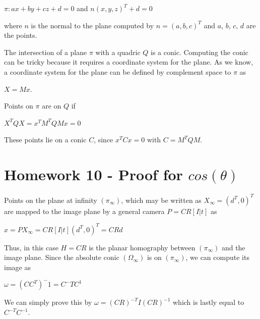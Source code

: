 \documentclass[]{article}
\begin{document}
\centerline {
	$\pi : ax + by + cz + d = 0$ and $n(x,y,z)^T + d = 0$
}

\vspace{0.5em}

where  $n$ is the normal to the plane computed by $n=(a,b,c)^T$ and $a$, $b$, $c$, $d$ are the points. 

The intersection of a plane $\pi$ with a quadric $Q$ is a conic. Computing the conic can be tricky because it requires a coordinate system for the plane. As we know, a coordinate system for the plane can be defined by complement space to $\pi$ as 

\centerline {
	$X= Mx$. 
}

Points on $\pi$ are on $Q$ if 

\vspace{0.5em}

\centerline {
	$X^TQX = x^TM^TQMx = 0$
}

\vspace{0.5em}

These points lie on a conic $C$, since $x^TCx = 0$ with $C = M^TQM$.
\section{Homework 10 - Proof for $cos(\theta)$}  

Points on the plane at infinity $(\pi _ \infty)$, which may be written as $X_ \infty = (d^T, 0)^T$ are mapped to the image plane by a general camera $P = CR[I|t]$ as 

\vspace{0.5em}

\centerline {
	$x = PX_ \infty = CR[I|t](d^T, 0)^T = CRd$
}

\vspace{0.5em}

Thus, in this case $H = CR$ is the planar homography between $(\pi _ \infty)$ and the image plane. Since the absolute conic $(\Omega _ \infty)$ is on $(\pi _ \infty)$, we can compute its image as 

\vspace{0.5em}

\centerline {
	$\omega = (CC^T)^-1 = C^-TC^1$
}

\vspace{0.5em}

We can simply prove this by $\omega = (CR)^{-T} I (CR)^{-1}$ which is lastly equal to $C^{-T}C^{-1}$. 

\vspace{0.5em}
\end{document}
